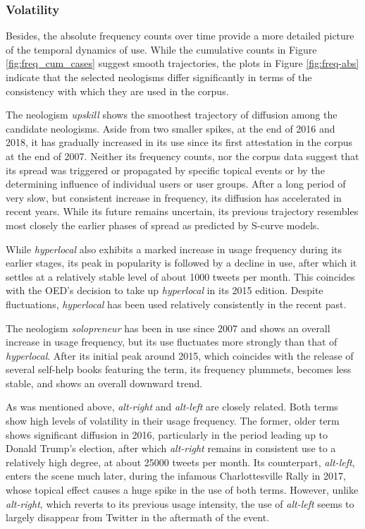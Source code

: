 \documentclass[
  a4paper,
  abstract=on,
  captions=tableabove,
  ]{scrartcl}
\newcommand{\ol}[1]{\emph{#1}}
\begin{document}
    \subsubsection{Volatility}
      \label{subsubsec:coef-var}

      Besides, the absolute frequency counts over time provide a more detailed picture of the temporal dynamics of use. While the cumulative counts in Figure \ref{fig:freq_cum_cases} suggest smooth trajectories, the plots in Figure \ref{fig:freq-abs} indicate that the selected neologisms differ significantly in terms of the consistency with which they are used in the corpus.

      The neologism \ol{upskill} shows the smoothest trajectory of diffusion among the candidate neologisms. Aside from two smaller spikes, at the end of 2016 and 2018, it has gradually increased in its use since its first attestation in the corpus at the end of 2007. Neither its frequency counts, nor the corpus data suggest that its spread was triggered or propagated by specific topical events or by the determining influence of individual users or user groups. After a long period of very slow, but consistent increase in frequency, its diffusion has accelerated in recent years. While its future remains uncertain, its previous trajectory resembles most closely the earlier phases of spread as predicted by S-curve models.

      While \ol{hyperlocal} also exhibits a marked increase in usage frequency during its earlier stages, its peak in popularity is followed by a decline in use, after which it settles at a relatively stable level of about \num{1000} tweets per month. This coincides with the OED's decision to take up \ol{hyperlocal} in its 2015 edition. Despite fluctuations, \ol{hyperlocal} has been used relatively consistently in the recent past.

      The neologism \ol{solopreneur} has been in use since 2007 and shows an overall increase in usage frequency, but its use fluctuates more strongly than that of \ol{hyperlocal}. After its initial peak around 2015, which coincides with the release of several self-help books featuring the term, its frequency plummets, becomes less stable, and shows an overall downward trend.

      As was mentioned above, \ol{alt-right} and \ol{alt-left} are closely related. Both terms show high levels of volatility in their usage frequency. The former, older term shows significant diffusion in 2016, particularly in the period leading up to Donald Trump's election, after which \ol{alt-right} remains in consistent use to a relatively high degree, at about \num{25000} tweets per month. Its counterpart, \ol{alt-left}, enters the scene much later, during the infamous Charlottesville Rally in 2017, whose topical effect causes a huge spike in the use of both terms. However, unlike \ol{alt-right}, which reverts to its previous usage intensity, the use of \ol{alt-left} seems to largely disappear from Twitter in the aftermath of the event.
\end{document}
